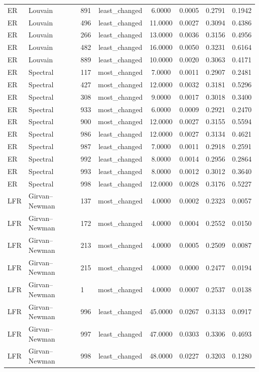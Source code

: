 \begin{longtable}{lllccccc}
ER & Louvain & 891 & least\_changed & 6.0000 & 0.0005 & 0.2791 & 0.1942 \\
ER & Louvain & 496 & least\_changed & 11.0000 & 0.0027 & 0.3094 & 0.4386 \\
ER & Louvain & 266 & least\_changed & 13.0000 & 0.0036 & 0.3156 & 0.4956 \\
ER & Louvain & 482 & least\_changed & 16.0000 & 0.0050 & 0.3231 & 0.6164 \\
ER & Louvain & 889 & least\_changed & 10.0000 & 0.0020 & 0.3063 & 0.4171 \\
ER & Spectral & 117 & most\_changed & 7.0000 & 0.0011 & 0.2907 & 0.2481 \\
ER & Spectral & 427 & most\_changed & 12.0000 & 0.0032 & 0.3181 & 0.5296 \\
ER & Spectral & 308 & most\_changed & 9.0000 & 0.0017 & 0.3018 & 0.3400 \\
ER & Spectral & 933 & most\_changed & 6.0000 & 0.0009 & 0.2921 & 0.2470 \\
ER & Spectral & 900 & most\_changed & 12.0000 & 0.0027 & 0.3155 & 0.5594 \\
ER & Spectral & 986 & least\_changed & 12.0000 & 0.0027 & 0.3134 & 0.4621 \\
ER & Spectral & 987 & least\_changed & 7.0000 & 0.0011 & 0.2918 & 0.2591 \\
ER & Spectral & 992 & least\_changed & 8.0000 & 0.0014 & 0.2956 & 0.2864 \\
ER & Spectral & 993 & least\_changed & 8.0000 & 0.0012 & 0.3012 & 0.3640 \\
ER & Spectral & 998 & least\_changed & 12.0000 & 0.0028 & 0.3176 & 0.5227 \\
LFR & Girvan--Newman & 137 & most\_changed & 4.0000 & 0.0002 & 0.2323 & 0.0057 \\
LFR & Girvan--Newman & 172 & most\_changed & 4.0000 & 0.0004 & 0.2552 & 0.0150 \\
LFR & Girvan--Newman & 213 & most\_changed & 4.0000 & 0.0005 & 0.2509 & 0.0087 \\
LFR & Girvan--Newman & 215 & most\_changed & 4.0000 & 0.0000 & 0.2477 & 0.0194 \\
LFR & Girvan--Newman & 1 & most\_changed & 4.0000 & 0.0007 & 0.2537 & 0.0138 \\
LFR & Girvan--Newman & 996 & least\_changed & 45.0000 & 0.0267 & 0.3133 & 0.0917 \\
LFR & Girvan--Newman & 997 & least\_changed & 47.0000 & 0.0303 & 0.3306 & 0.4693 \\
LFR & Girvan--Newman & 998 & least\_changed & 48.0000 & 0.0227 & 0.3203 & 0.1280 \\

\end{longtable}
